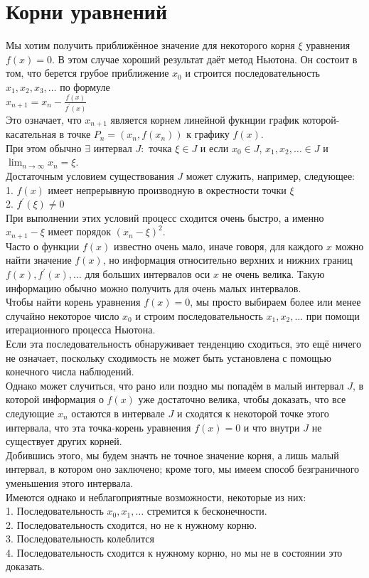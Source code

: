 \documentclass{report}
\begin{document}
\section{Корни уравнений}
Мы хотим получить приближённое значение для некоторого корня $\xi$ уравнения $f(x)=0$. В этом случае хороший результат даёт метод Ньютона. Он состоит в том, что берется грубое приближение $x_0$
и строится последовательность $x_1, x_2, x_3, \dots$ по формуле \\
$x_{n+1}=x_n-\frac{f(x)}{f^{\prime}(x)}$ \\
Это означает, что $x_{n+1}$ является корнем линейной фукнции график которой-касательная в точке $P_n=(x_n,f(x_n))$ к графику $f(x)$. \\
При этом обычно $\exists$ интервал $J:$ точка $\xi\in{J}$ и если $x_0\in{J}$, $x_1, x_2,\dots\in{J}$ и $\lim_{n\to\infty}x_n=\xi$. \\
Достаточным условием существования $J$ может служить, например, следующее: \\
1. $f(x)$ имеет непрерывную производную в окрестности точки $\xi$ \\
2. $f^{\prime}(\xi)\neq{0}$ \\
При выполнении этих условий процесс сходится очень быстро, а именно $x_{n+1}-\xi$ имеет порядок $(x_n-\xi)^{2}$. \\
Часто о функции $f(x)$ известно очень мало, иначе говоря, для каждого $x$ можно найти значение $f(x)$, но информация относительно верхних и нижних границ $f(x),f^{\prime}(x),\dots$
для больших интервалов оси $x$ не очень велика. Такую информацию обычно можно получить для очень малых интервалов. \\
Чтобы найти корень уравнения $f(x)=0$, мы просто выбираем более или менее случайно некоторое число $x_0$ и строим последовательность $x_1, x_2, \dots$ при помощи итерационного процесса Ньютона. \\
Если эта последовательность обнаруживает тенденцию сходиться, это ещё ничего не означает, поскольку сходимость не может быть установлена с помощью конечного числа наблюдений. \\
Однако может случиться, что рано или поздно мы попадём в малый интервал $J$, в которой информация о $f(x)$ уже достаточно велика, чтобы доказать, что все следующие $x_n$ остаются
в интервале $J$ и сходятся к некоторой точке этого интервала, что эта точка-корень уравнения $f(x)=0$ и что внутри $J$ не существует других корней. \\
Добившись этого, мы будем значть не точное значение корня, а лишь малый интервал, в котором оно заключено; кроме того, мы имеем способ безграничного уменьшения этого интервала. \\
Имеются однако и неблагоприятные возможности, некоторые из них: \\
1. Последовательность $x_0, x_1, \dots$ стремится к бесконечности. \\
2. Последовательность сходится, но не к нужному корню. \\
3. Последовательность колеблится \\
4. Последовательность сходится к нужному корню, но мы не в состоянии это доказать. \\
\newpage
\end{document}
